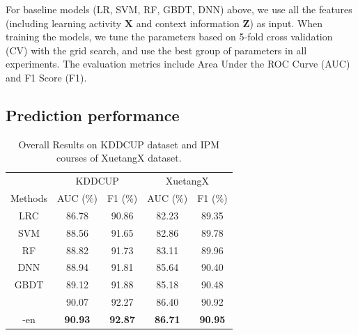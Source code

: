 	For baseline models (LR, SVM, RF, GBDT, DNN) above, we use all the features (including learning activity $\mathbf{X}$ and context information $\mathbf{Z}$) as input. 
	When training the models,  we tune the parameters based on 5-fold cross validation (CV) with the grid search, and use the best group of parameters in all experiments. The evaluation metrics include Area Under the ROC Curve (AUC) and F1 Score (F1).
	
	\subsection{Prediction performance}
	
	\begin{table}
		\centering
		\caption{Overall Results on KDDCUP dataset and IPM courses of XuetangX  dataset. }
		\setlength{\tabcolsep}{2.3mm}\begin{tabular}{c|cc|cc}
			\hline \hline
			              &\multicolumn{2}{c|}{KDDCUP} &\multicolumn{2}{c}{XuetangX}\\
			  Methods & AUC (\%) & F1 (\%) & AUC (\%) & F1 (\%) \\

			 \hline
			  LRC                      & 86.78 & 90.86   &82.23  & 89.35 \\
			  \hline
		     SVM                   &  88.56	  & 91.65	   &   82.86  &89.78 \\
			\hline
			RF                       & 88.82  & 91.73  &83.11  &89.96 \\
			\hline
			DNN                   &  88.94     & 91.81           & 85.64  &90.40 \\
			\hline
			GBDT        & 89.12& 91.88 & 85.18& 90.48\\
			 \hline
			 \modelname{}					&90.07 &92.27   & 86.40& 90.92\\
			\hline
			\modelname{}-en         & \textbf{90.93}    &\textbf{92.87} &  \textbf{86.71}   & \textbf{90.95} \\
			\hline	\hline
		\end{tabular}
		\label{tab:allRes}
	\end{table}


